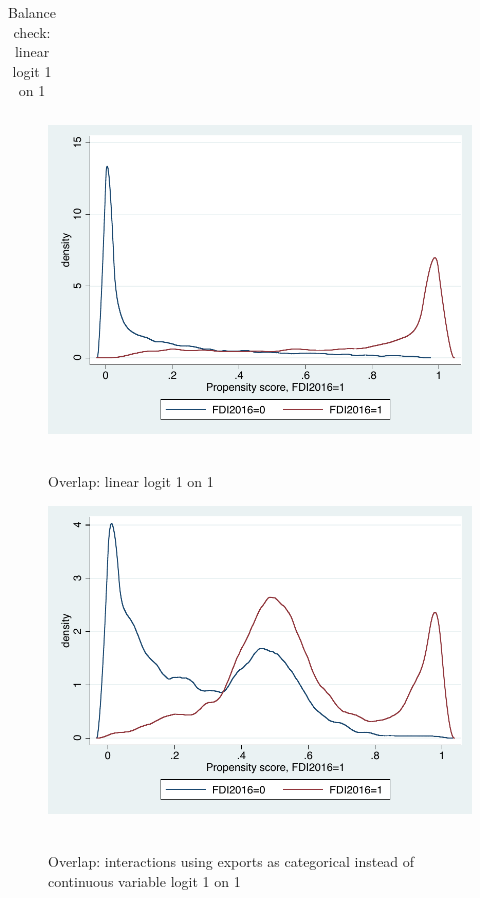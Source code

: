 \documentclass[11pt,a4paper,leqno]{article}
\begin{document}
\begin{table}
	\centering
\begin{tabular}{lcccc}
	
\end{tabular}
	\caption{Balance check: linear logit 1 on 1}
	\label{bal_linlog1}
\end{table}

\begin{figure}
	\centering
	\includegraphics[scale=0.6]{figures_and_tables/3_overlap_linearlogit1o1.pdf}\
	\caption{Overlap: linear logit 1 on 1 }
	\label{ol_linlog1}
\end{figure}

\begin{figure}
	\centering
	\includegraphics[scale=0.6]{figures_and_tables/3_overlap_intcatlogit1o1.pdf}\
	\caption{Overlap: interactions using exports as categorical instead of continuous variable logit 1 on 1 }
	\label{ol_intcatlog1}
\end{figure}
\end{document}
